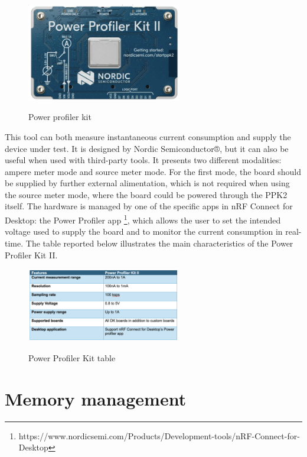 \documentclass{Configuration_Files/PoliMi3i_thesis}
\begin{document}
\begin{figure}[H]
    \centering
    \includegraphics[width=0.6\textwidth]{Materials/figure4}
    \label{materials_4}
    \caption{Power profiler kit}
\end{figure}

This tool can both measure instantaneous current consumption and supply the device under test. It is designed by Nordic Semiconductor®, but it can also be useful when used with third-party tools. It presents two different modalities: ampere meter mode and source meter mode. For the first mode, the board should be supplied by further external alimentation, which is not required when using the source meter mode, where the board could be powered through the PPK2 itself. The hardware is managed by one of the specific apps in nRF Connect for Desktop: the Power Profiler app \footnote{https://www.nordicsemi.com/Products/Development-tools/nRF-Connect-for-Desktop}, which allows the user to set the intended voltage used to supply the board and to monitor the current consumption in real-time. The table reported below illustrates the main characteristics of the Power Profiler Kit II.

\begin{figure}[H]
    \centering
    \includegraphics[width=0.6\textwidth]{Materials/figure5}
    \label{materials_5}
    \caption{Power Profiler Kit table}
\end{figure}


\section{Memory management}
\end{document}

